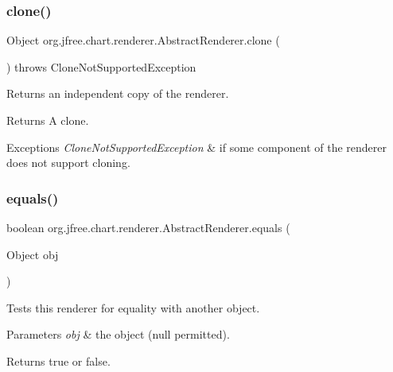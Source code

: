 \subsubsection{\texorpdfstring{clone()}{clone()}}
{\footnotesize\ttfamily Object org.\+jfree.\+chart.\+renderer.\+Abstract\+Renderer.\+clone (\begin{DoxyParamCaption}{ }\end{DoxyParamCaption}) throws Clone\+Not\+Supported\+Exception\hspace{0.3cm}{\ttfamily [protected]}}

Returns an independent copy of the renderer.

\begin{DoxyReturn}{Returns}
A clone.
\end{DoxyReturn}

\begin{DoxyExceptions}{Exceptions}
{\em Clone\+Not\+Supported\+Exception} & if some component of the renderer does not support cloning. \\
\hline
\end{DoxyExceptions}
\mbox{\label{classorg_1_1jfree_1_1chart_1_1renderer_1_1_abstract_renderer_af53080cd377d0280e820402a50ab17bb}} 
\subsubsection{\texorpdfstring{equals()}{equals()}}
{\footnotesize\ttfamily boolean org.\+jfree.\+chart.\+renderer.\+Abstract\+Renderer.\+equals (\begin{DoxyParamCaption}\item[{Object}]{obj }\end{DoxyParamCaption})}

Tests this renderer for equality with another object.


\begin{DoxyParams}{Parameters}
{\em obj} & the object ({\ttfamily null} permitted).\\
\hline
\end{DoxyParams}
\begin{DoxyReturn}{Returns}
{\ttfamily true} or {\ttfamily false}. 
\end{DoxyReturn}
\mbox{\label{classorg_1_1jfree_1_1chart_1_1renderer_1_1_abstract_renderer_a5008f133b351c9c6c72d7abca08f65a7}} 
